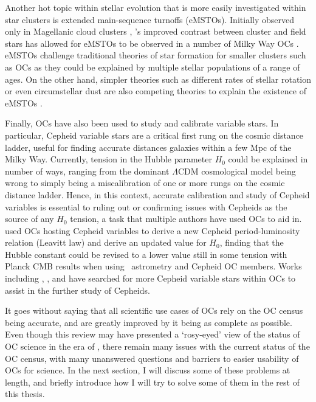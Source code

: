 Another hot topic within stellar evolution that is more easily investigated within star clusters is extended main-sequence turnoffs (eMSTOs). Initially observed only in Magellanic cloud clusters \citep[e.g.][]{bastian_effect_stellar_2009}, \gaia's improved contrast between cluster and field stars has allowed for eMSTOs to be observed in a number of Milky Way OCs \cite{marino_discovery_2018}. eMSTOs challenge traditional theories of star formation for smaller clusters such as OCs as they could be explained by multiple stellar populations of a range of ages. On the other hand, simpler theories such as different rates of stellar rotation or even circumstellar dust are also competing theories to explain the existence of eMSTOs \citep{milone_multiple_2022,dantona_role_dust_2023}.

Finally, OCs have also been used to study and calibrate variable stars. In particular, Cepheid variable stars are a critical first rung on the cosmic distance ladder, useful for finding accurate distances galaxies within a few Mpc of the Milky Way. Currently, tension in the Hubble parameter $H_0$ could be explained in number of ways, ranging from the dominant $\Lambda$CDM cosmological model being wrong to simply being a miscalibration of one or more rungs on the cosmic distance ladder. Hence, in this context, accurate calibration and study of Cepheid variables is essential to ruling out or confirming issues with Cepheids as the source of any $H_0$ tension, a task that multiple authors have used OCs to aid in. \cite{breuval_milky_way_2020} used OCs hosting Cepheid variables to derive a new Cepheid period-luminosity relation (Leavitt law) and derive an updated value for $H_0$, finding that the Hubble constant could be revised to a lower value still in some tension with Planck CMB results \citep{planckcollaboration_planck_2018_2020} when using \gaia\ astrometry and Cepheid OC members. Works including \cite{medina_revisited_2021}, \cite{zhou_galactic_2021}, and \cite{hao_open_2022} have searched for more Cepheid variable stars within OCs to assist in the further study of Cepheids.

It goes without saying that all scientific use cases of OCs rely on the OC census being accurate, and are greatly improved by it being as complete as possible. Even though this review may have presented a `rosy-eyed' view of the status of OC science in the era of \gaia, there remain many issues with the current status of the OC census, with many unanswered questions and barriers to easier usability of OCs for science. In the next section, I will discuss some of these problems at length, and briefly introduce how I will try to solve some of them in the rest of this thesis.



